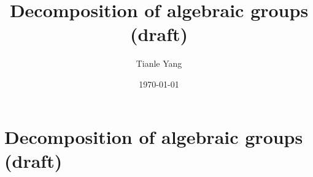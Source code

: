 \documentclass{noteformyself}
\title{Decomposition of algebraic groups (draft)}
\author{Tianle Yang}
\date{\today}
\begin{document}
    \maketitle

    \section{Decomposition of algebraic groups (draft)}


\end{document}
